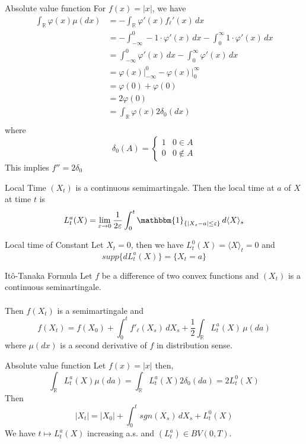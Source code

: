 \documentclass[12pt,a4paper]{article}
\newcommand{\R}{\mathbb{R}}
\begin{document}
\begin{example}{Absolute value function}{}
    For $f(x) = |x|$, we have
    \begin{align*}
        \int_\R \varphi(x) \mu(dx) &= -\int_\R \varphi'(x) f_{\ell}'(x)\,dx\\
        &= -\int_{-\infty}^0 -1\cdot \varphi'(x)\, dx - \int_0^\infty 1\cdot \varphi'(x)\, dx\\
        &= \int_{-\infty}^0 \varphi'(x)\, dx - \int_0^\infty \varphi'(x)\, dx\\
        &= \varphi(x)\bigg|_{-\infty}^0 - \varphi(x)\bigg|_{0}^{\infty}\\
        &= \varphi(0) + \varphi(0)\\
        &= 2\varphi(0)\\
        &= \int_\R \varphi(x)2\delta_0(dx)\\
    \end{align*}
    where 
    $$
    \delta_0(A) = \begin{cases}
        1 & 0\in A\\
        0 & 0\notin A
    \end{cases}
    $$
    This implies $f'' = 2\delta_0$
\end{example}
\pagebreak
\begin{definition}{Local Time}{}
    $(X_t)$ is a continuous semimartingale. Then the local time at $a$ of $X$ at time $t$ is
    $$
    L_t^a(X) = \lim_{\varepsilon\to 0}\frac{1}{2\varepsilon} \int_0^t \mathbbm{1}_{\{|X_s-a|\le \varepsilon\}}\, d\langle X\rangle_s
    $$
\end{definition}
\begin{example}{Local time of Constant}{}
    Let $X_t = 0$, then we have $L_t^0(X) = \langle X\rangle_t = 0$ and
    $$
    supp\{dL_t^a(X)\} = \{X_t=a\}
    $$
\end{example}
\pagebreak
\begin{theorem}{It\^{o}-Tanaka Formula}{}
    Let $f$ be a difference of two convex functions and $(X_t)$ is a continuous seminartingale.\\
    \\
    Then $f(X_t)$ is a semimartingale and
    $$
    f(X_t) = f(X_0)+\int_0^t f'_{\ell} (X_s)\, dX_s + \frac{1}{2}\int_\R L_t^a(X) \, \mu(da)
    $$
    where $\mu (dx)$ is a second derivative of $f$ in distribution sense.
\end{theorem}
\begin{example}{Absolute value function}{}
    Let $f(x) = |x|$ then,
    $$
    \int_\R L_t^a(X) \mu(da) = \int_\R L_t^a(X) 2\delta_0(da) = 2L_t^0(X)
    $$
    Then
    $$
    |X_t| = |X_0| + \int_0^t sgn(X_s)\, dX_s + L_t^0(X)
    $$
    We have $t\mapsto L_t^a(X)$ increasing a.s. and $(L_t^a)\in BV(0,T)$.
\end{example}
\end{document}
